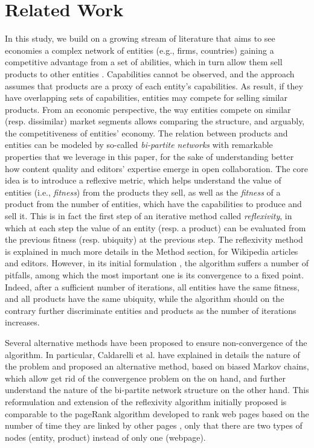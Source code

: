 \section{Related Work}
In this study, we build on a growing stream of literature that aims to see economies a complex network of entities (e.g., firms, countries) gaining a competitive advantage from a set of abilities, which in turn allow them sell products to other entities \cite{hidalgo2007}. Capabilities cannot be observed, and the approach assumes that products are a proxy of each entity's capabilities. As result, if they have overlapping sets of capabilities, entities may compete for selling similar products. From an economic perspective, the way entities compete on similar (resp. dissimilar) market segments allows comparing the structure, and arguably, the competitiveness of entities' economy. The relation between products and entities can be modeled by so-called {\it bi-partite networks} with remarkable properties \cite{hidalgo2009} that we leverage in this paper, for the sake of understanding better how content quality and editors' expertise emerge in open collaboration. The core idea is to introduce a reflexive metric, which helps understand the value of entities (i.e., {\it fitness}) from the products they sell, as well as the {\it fitness} of a product from the number of entities, which have the capabilities to produce and sell it. This is in fact the first step of an iterative method called {\it reflexivity}, in which at each step the value of an entity (resp. a product) can be evaluated from the previous fitness (resp. ubiquity) at the previous step. The reflexivity method is explained in much more details in the Method section, for Wikipedia articles and editors. However, in its initial formulation \cite{hidalgo2009}, the algorithm suffers a number of pitfalls,  among which the most important one is its convergence to a fixed point. Indeed, after a sufficient number of iterations, all entities have the same fitness, and all products have the same ubiquity, while the algorithm should on the contrary further discriminate entities and products as the number of iterations increases. 

Several alternative methods have been proposed to ensure non-convergence of the algorithm\cite{tacchella2012new,cristelli2012competitors,tacchella2013economic,cristelli2013measuring}. In particular, Caldarelli et al. \cite{caldarelli2012network} have explained in details the nature of the problem and proposed an alternative method, based on biased Markov chains, which allow get rid of the convergence problem on the on hand, and further understand the nature of the bi-partite network structure on the other hand. This reformulation and extension of the reflexivity algorithm initially proposed is comparable to the pageRank algorithm developed to rank web pages based on the number of time they are linked by other pages \cite{page1999pagerank}, only that there are two types of nodes (entity, product) instead of only one (webpage).

